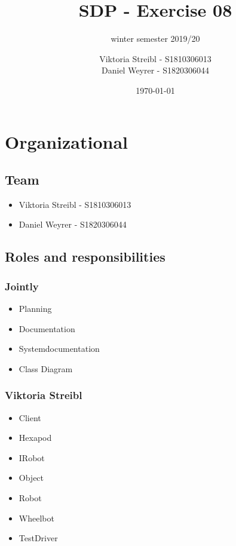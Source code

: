 
\graphicspath{{./}}



\title{SDP - Exercise 08} %
\subtitle{winter semester 2019/20} %
\author{
Viktoria Streibl - S1810306013\\
  Daniel Weyrer - S1820306044
} %
\date{\today} %

\maketitle %

\newpage
\tableofcontents %
\newpage


\section{Organizational}
\subsection{Team}
\begin{itemize}
	\item Viktoria 	Streibl 		- 	S1810306013
	\item Daniel 	Weyrer		-	S1820306044
\end{itemize}

\subsection{Roles and responsibilities}
\subsubsection{Jointly}
\begin{itemize}
	\item Planning
	\item Documentation
	\item Systemdocumentation
	\item Class Diagram
\end{itemize}

\subsubsection{Viktoria Streibl}
\begin{itemize}
	\item Client
	\item Hexapod
	\item IRobot
	\item Object
	\item Robot
	\item Wheelbot
	\item TestDriver
\end{itemize}


